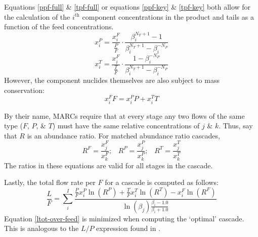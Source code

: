 \documentclass{ansconf}
\newcommand{\ith}[0]{$i^{\mbox{th}}$ }
\begin{document}
Equations \ref{ppf-full} \& \ref{tpf-full} or equations \ref{ppf-key} \& 
\ref{tpf-key} both allow for the calculation of the \ith component concentrations in 
the product and tails as a function of the feed concentrations.
\begin{equation}
x_i^P = \frac{x_i^F}{\frac{P}{F}}\cdot\frac{\beta_i^{N_T+1} - 1}
                                           {\beta_i^{N_T+1} - \beta_i^{-N_P}}
\label{prod-concentration}
\end{equation}
\begin{equation}
x_i^T = \frac{x_i^F}{\frac{T}{F}}\cdot\frac{1 - \beta_i^{-N_P}}
                                           {\beta_i^{N_T+1} - \beta_i^{-N_P}}
\label{tail-concentration}
\end{equation}
However, the component nuclides themselves are
also subject to mass conservation:
\begin{equation}
x_i^FF = x_i^PP + x_i^TT
\label{comp-flow-constraint}
\end{equation}

By their name, MARCs require that at every stage any two flows of 
the same type ($F$, $P$, \& $T$) must have the same relative concentrations of 
$j$ \& $k$.  Thus, say that $R$ is an abundance ratio.  For matched abundance 
ratio cascades, 
\begin{equation}
R^F = \frac{x_j^F}{x_k^F}; \;\;\; R^P = \frac{x_j^P}{x_k^P}; \;\;\; 
R^T = \frac{x_j^T}{x_k^T}
\label{abund_ratios}
\end{equation}
The ratios in these equations are valid for all stages in the cascade.

Lastly, the total flow rate per $F$ for a cascade is computed as follows:
\begin{equation}
\frac{L}{F} = \sum_i^I \frac{\frac{P}{F}x_i^P\ln(R^P) + \frac{T}{F}x_i^T\ln(R^T) 
                                                      - x_i^F\ln(R^F)}
                            {\ln(\beta_j)\frac{\beta_i - 1.0}{\beta_i + 1.0}}
\label{ltot-over-feed}
\end{equation}
Equation \ref{ltot-over-feed} is minimized when computing the `optimal' cascade.
This is analogous to the $L/P$ expression found in \cite{Wood1999}.
\end{document}
